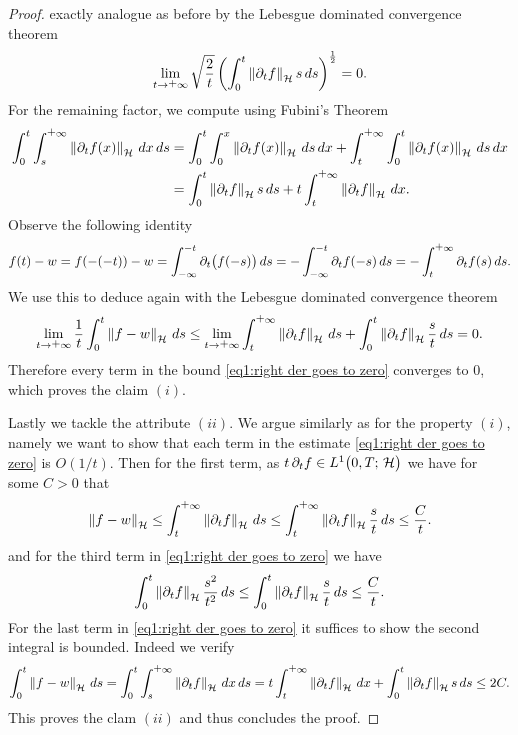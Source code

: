 \begin{proof}
	exactly analogue as before by the Lebesgue dominated convergence theorem
	\begin{align*}
		\lim_{t\ra\plus\infty}\sqrt{\frac{2}{t}}
		\left(\int_0^t\norm{\prt_t f} s\,ds\right)^{\frac{1}{2}}
		=0.
	\end{align*}
	For the remaining factor, we compute using Fubini's Theorem
	\begin{align*}
		\int_0^t\int_s^{\plus\infty}\norm{\prt_t f(x)}\,dx\,ds
		&=\int_0^t\int_0^x\norm{\prt_t f(x)}\,ds\,dx
		+\int_t^{\plus\infty}\int_0^t\norm{\prt_t f(x)}\,ds\,dx\\
		&=\int_0^t\norm{\prt_t f} s\,ds
		+t\int_t^{\plus\infty}\norm{\prt_t f}\,dx.
	\end{align*}
	Observe the following identity
	\begin{align*}
		f(t)-w
		=f(-(-t))-w
		=\int_{-\infty}^{-t}\prt_t\big(f(-s)\big)\,ds
		=-\int_{-\infty}^{-t}\prt_t f(-s)\,ds
		=-\int_{t}^{\plus\infty}\prt_t f(s)\,ds.
	\end{align*}
	We use this to deduce again with the Lebesgue dominated convergence theorem
	\begin{align*}
		\lim_{t\ra\plus\infty}\frac{1}{t}\int_0^t\norm{f-w}\,ds
		\leq \lim_{t\ra\plus\infty}\int_t^{\plus\infty}\norm{\prt_t f}\,ds
		+\int_0^t\norm{\prt_t f}\frac{s}{t}\,ds
		=0.
	\end{align*}
	Therefore every term in the bound \eqref{eq1:right der goes to zero} converges
	to $ 0 $, which proves the claim $ (i) $.\smallskip
	
	Lastly we tackle the attribute $ (ii) $. We argue similarly as for
	the property $ (i) $, namely we want to show that each term in
	the estimate \eqref{eq1:right der goes to zero} is $ O(1/t) $.
	Then for the first term, as $ t\,\partial_t f\in L^{1}\big(0,T;\,\mathcal{H}\big) $ we have 
	for some $ C>0 $ that
	\begin{align*}
		\norm{f-w}
		\leq \int_t^{\plus\infty}\norm{\prt_t f}\,ds
		\leq \int_t^{\plus\infty}\norm{\prt_t f} \frac{s}{t}\,ds
		\leq \frac{C}{t}.
	\end{align*}
	and for the third term in \eqref{eq1:right der goes to zero} we have
	\begin{align*}
		\int_0^t\left\Vert \partial_t f\right\Vert_{\mathcal{H}}\frac{s^2}{t^2}\,ds
		\leq \int_0^t\left\Vert \partial_t f\right\Vert_{\mathcal{H}}\frac{s}{t}\,ds
		\leq \frac{C}{t}.
	\end{align*}
	For the last term in \eqref{eq1:right der goes to zero} it suffices to show
	the second integral is bounded. Indeed we verify
	\begin{align*}
		\int_0^t\norm{f-w}\,ds
		=\int_0^t\int_s^{\plus\infty}\norm{\prt_t f}\,dx\,ds
		=t\int_t^{\plus\infty}\norm{\prt_t f}\,dx
		+\int_0^{t}\norm{\prt_t f} s\,ds
		\leq 2C.
	\end{align*}
	This proves the clam $ (ii) $ and thus concludes the proof.
\end{proof}